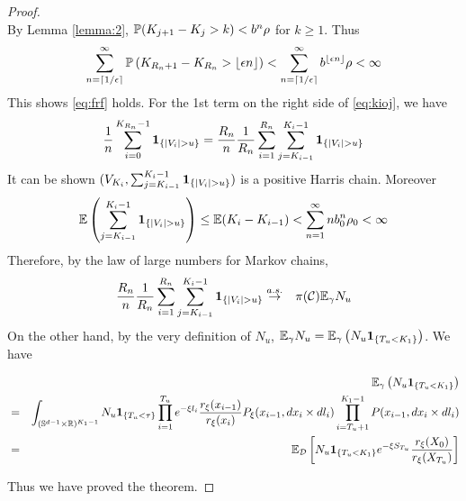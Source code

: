 \begin{proof}
\[  \]
  By Lemma \ref{lemma:2}, $\P(K_{j + 1} - K_j > k) < b^n \rho$ for $k \geq 1$.
  Thus
  \[
    \sum_{n=\ceil{1/\epsilon}}^\infty \P\left(
    {K_{R_n + 1} - K_{R_n}} > \floor{\epsilon n}
  \right)
  <
  \sum_{n=\ceil{1/\epsilon}}^\infty b^{\floor{\epsilon n}} \rho < \infty
  \]
  This shows \eqref{eq:frf} holds.
  For the 1st term on the right side of \eqref{eq:kioj}, we have
  \[
  {1 \over n} \sum_{i=0}^{K_{R_n}-1} \1{|V_i| > u}
    =
    {R_n \over n} {1 \over R_n} \sum_{i=1}^{R_n}
    \sum_{j=K_{i-1}}^{K_i-1}\1{|V_i| > u}
  \]
  It can be shown $(V_{K_i}, \sum_{j=K_{i-1}}^{K_i-1}\1{|V_i| > u})$
  is a positive Harris chain. Moreover
  \[
  \E \left(
    \sum_{j=K_{i-1}}^{K_i-1}\1{|V_i| > u}
  \right)
  \leq
  \E (K_i - K_{i-1}) < \sum_{n=1}^\infty n b_0^n \rho_0 < \infty
  \]
  Therefore, by the law of large numbers for Markov chains,
  \begin{eqnarray*}
    {R_n \over n} {1 \over R_n} \sum_{i=1}^{R_n}
    \sum_{j=K_{i-1}}^{K_i-1}\1{|V_i| > u}
    &\overset{a.s.}{\to}& \pi(\mathcal C) \E_\gamma N_u
  \end{eqnarray*}
  On the other hand, by the very definition of $N_u$,
  $\E_\gamma N_u = \E_\gamma \left( N_u \1{T_u < K_1}\right)$. We have
  \begin{small}
    \begin{eqnarray*}
      && \E_\gamma \left( N_u \1{T_u < K_1}\right) \\
      &=&
      \int_{(\sphere^{d-1} \times \reals)^{K_1 - 1}}
      N_u \1{T_u < \tau}
      \prod_{i=1}^{T_u} e^{-\xi l_i}
      {r_\xi(x_{i-1}) \over r_\xi(x_{i})}P_\xi(x_{i-1}, dx_i \times dl_i)
      \prod_{i=T_u+1}^{K_1 - 1} P(x_{i-1}, dx_i \times d l_i) \\
      &=&
      \E_{\mathcal D}
      \left[
        N_u \1{T_u < K_1} e^{-\xi S_{T_u}}
        {r_\xi(X_0)
          \over
          r_\xi(X_{T_u})
        }
      \right]
    \end{eqnarray*}
  \end{small}
  Thus we have proved the theorem.
\end{proof}

